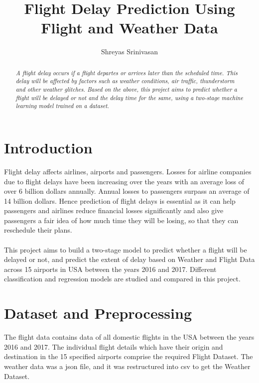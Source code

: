\documentclass[12pt,letter-paper]{article}
\begin{document}
\title{Flight Delay Prediction Using Flight and Weather Data}
\author{Shreyas Srinivasan}
\date{}
\maketitle

\begin{abstract}
    \textit{A flight delay occurs if a flight departes or arrives later than the scheduled time. This delay will be affected by factors such as weather conditions, air traffic, thunderstorm and other weather glitches. Based on the above, this project aims to predict whether a flight will be delayed or not and the delay time for the same, using a two-stage machine learning model trained on a dataset.}
\end{abstract}


\section{Introduction}

    Flight delay affects airlines, airports and passengers. Losses for airline companies due to flight delays have been increasing over the years with an average loss of over 6 billion dollars annually. Annual losses to passengers surpass an average of 14 billion dollars. Hence prediction of flight delays is essential as it can help passengers and airlines reduce financial losses significantly and also give passengers a fair idea of how much time they will be losing, so that they can reschedule their plans.
    \paragraph{}
    
    This project aims to build a two-stage model to predict whether a flight will be delayed or not, and predict the extent of delay based on Weather and Flight Data across 15 airports in USA between the years 2016 and 2017. Different classification and regression models are studied and compared in this project.
    
\section{Dataset and Preprocessing}
   
     The flight data contains data of all domestic flights in the USA between the years 2016 and 2017. The individual flight details which have their origin and destination in the 15 specified airports comprise the required Flight Dataset. The weather data was a json file, and it was restructured into csv to get the Weather Dataset. 
\end{document}
